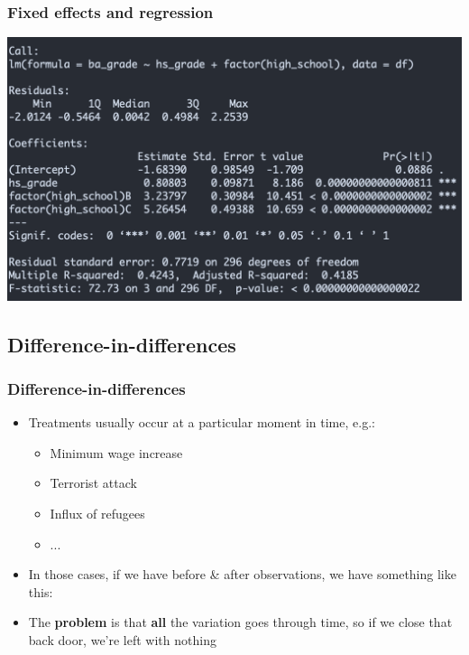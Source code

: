 \documentclass[aspectratio=43]{beamer}
\begin{document}
\begin{frame}
\frametitle{Fixed effects and regression}
\centering

\includegraphics[width = \textwidth]{../img/fe_lm2}

\end{frame}

\subsection*{Difference-in-differences}

\begin{frame}
\frametitle{Difference-in-differences}
\centering

\begin{itemize}
  \item Treatments usually occur at a particular moment in time, e.g.:
  \begin{itemize}
    \item Minimum wage increase
    \item Terrorist attack
    \item Influx of refugees
    \item ...
  \end{itemize}
  \item In those cases, if we have before \& after observations, we have something like this:
\end{itemize}


\begin{itemize}
  \item The \textbf{problem} is that \textbf{all} the variation goes through time, so if we close that back door, we're left with nothing
\end{itemize}

\end{frame}
\end{document}
